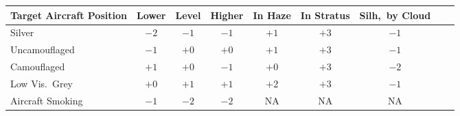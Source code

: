 \begin{TABLE*}


\begin{tabular}{lcccccccc}
\hline
Target Aircraft Position&Lower&Level&Higher&In Haze&In Stratus&Silh,\ by Cloud\\
\hline
Silver          &$-2$&$-1$&$-1$&$+1$&$+3$&$-1$\\
Uncamouflaged   &$-1$&$+0$&$+0$&$+1$&$+3$&$-1$\\
Camouflaged     &$+1$&$+0$&$-1$&$+0$&$+3$&$-2$\\
Low Vis.\ Grey  &$+0$&$+1$&$+1$&$+2$&$+3$&$-1$\\
Aircraft Smoking&$-1$&$-2$&$-2$&NA&NA&NA\\
\hline
\end{tabular}

\end{TABLE*}

